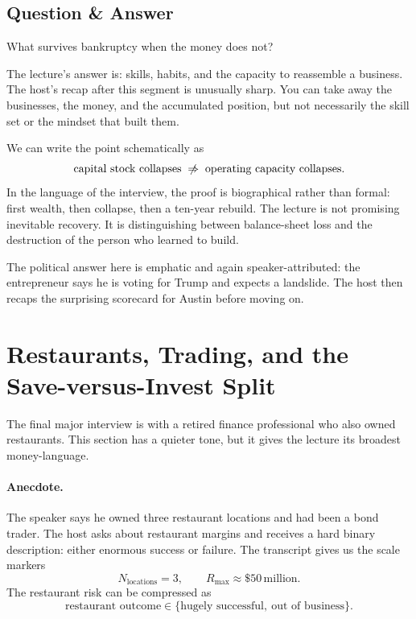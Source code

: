 \subsection{Question \& Answer}

What survives bankruptcy when the money does not?

The lecture's answer is: skills, habits, and the capacity to reassemble a business. The host's recap after this segment is unusually sharp. You can take away the businesses, the money, and the accumulated position, but not necessarily the skill set or the mindset that built them.

We can write the point schematically as
\begin{equation}
\text{capital stock collapses} \;\centernot\Rightarrow\; \text{operating capacity collapses}.
\end{equation}
In the language of the interview, the proof is biographical rather than formal: first wealth, then collapse, then a ten-year rebuild. The lecture is not promising inevitable recovery. It is distinguishing between balance-sheet loss and the destruction of the person who learned to build.

The political answer here is emphatic and again speaker-attributed: the entrepreneur says he is voting for Trump and expects a landslide. The host then recaps the surprising scorecard for Austin before moving on.

\section{Restaurants, Trading, and the Save-versus-Invest Split}

The final major interview is with a retired finance professional who also owned restaurants. This section has a quieter tone, but it gives the lecture its broadest money-language.

\paragraph{Anecdote.}
The speaker says he owned three restaurant locations and had been a bond trader. The host asks about restaurant margins and receives a hard binary description: either enormous success or failure. The transcript gives us the scale markers
\begin{equation}
N_{\text{locations}} = 3,\qquad
R_{\max} \approx \$50\,\text{million}.
\end{equation}
The restaurant risk can be compressed as
\begin{equation}
\text{restaurant outcome} \in \{\text{hugely successful},\ \text{out of business}\}.
\end{equation}


